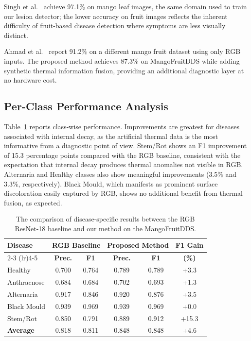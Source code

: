 \documentclass[utf8]{FrontiersinHarvard} %
\begin{document}
Singh et al.~\cite{singh2019} achieve 97.1\% on mango leaf images, the same domain used to train our lesion detector; the lower accuracy on fruit images reflects the inherent difficulty of fruit-based disease detection where symptoms are less visually distinct.

Ahmad et al.~\cite{ahmad2023} report 91.2\% on a different mango fruit dataset using only RGB inputs. The proposed method achieves 87.3\% on MangoFruitDDS while adding synthetic thermal information fusion, providing an additional diagnostic layer at no hardware cost.

\subsection{Per-Class Performance Analysis}
Table~\ref{tab:perclass} reports class-wise performance. Improvements are greatest for diseases associated with internal decay, as the artificial thermal data is the most informative from a diagnostic point of view. Stem/Rot shows an F1 improvement of 15.3 percentage points compared with the RGB baseline, consistent with the expectation that internal decay produces thermal anomalies not visible in RGB. Alternaria and Healthy classes also show meaningful improvements (3.5\% and 3.3\%, respectively). Black Mould, which manifests as prominent surface discoloration easily captured by RGB, shows no additional benefit from thermal fusion, as expected.

\begin{table}[!ht]
    \caption{The comparison of disease-specific results between the RGB ResNet-18 baseline and our method on the MangoFruitDDS.}
    \label{tab:perclass}
    \raggedright
    \scriptsize
    \begin{tabular}{lccccc}
        \toprule
        \multirow{2}{*}{\textbf{Disease}} & \multicolumn{2}{c}{\textbf{RGB Baseline}} & \multicolumn{2}{c}{\textbf{Proposed Method}} & \textbf{F1 Gain} \\
        \cmidrule(lr){2-3} \cmidrule(lr){4-5}
         & \textbf{Prec.} & \textbf{F1} & \textbf{Prec.} & \textbf{F1} & \textbf{(\%)} \\
        \midrule
        Healthy & 0.700 & 0.764 & 0.789 & 0.789 & +3.3 \\
        Anthracnose & 0.684 & 0.684 & 0.702 & 0.693 & +1.3 \\
        Alternaria & 0.917 & 0.846 & 0.920 & 0.876 & +3.5 \\
        Black Mould & 0.939 & 0.969 & 0.939 & 0.969 & +0.0 \\
        Stem/Rot & 0.850 & 0.791 & 0.889 & 0.912 & +15.3 \\
        \midrule
        \textbf{Average} & 0.818 & 0.811 & 0.848 & 0.848 & +4.6 \\
        \bottomrule
    \end{tabular}
\end{table}
\end{document}
